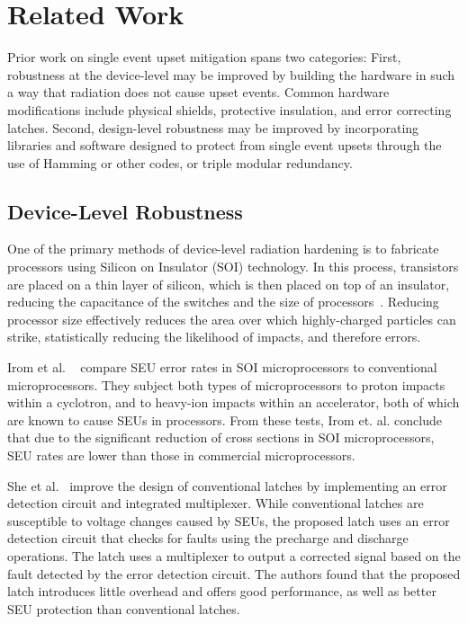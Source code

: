 \vspace{-25pt}
\section{Related Work}\label{sec:related_work}
\vspace{-10pt}
Prior work on single event upset mitigation spans two categories:
First, robustness at the device-level may be improved by building the hardware in such a way that radiation does not cause upset events. 
Common hardware modifications include physical shields, protective insulation, and error correcting latches.
Second, design-level robustness may be improved by incorporating libraries and software designed to protect from single event upsets through the use of Hamming or other codes, or triple modular redundancy.
\vspace{-15pt}
\subsection{Device-Level Robustness}
\vspace{-5pt}
One of the primary methods of device-level radiation hardening is to fabricate processors using Silicon on Insulator (SOI) technology.
In this process, transistors are placed on a thin layer of silicon, which is then placed on top of an insulator, reducing the capacitance of the switches and the size of processors~\cite{Celler2003SOI}.
Reducing processor size effectively reduces the area over which highly-charged particles can strike, statistically reducing the likelihood of impacts, and therefore errors.

Irom et al. ~\cite{Irom2002SOI} compare SEU error rates in  SOI microprocessors to conventional microprocessors.
They subject both types of microprocessors to proton impacts within a cyclotron, and to heavy-ion impacts within an accelerator, both of which are known to cause SEUs in processors.
From these tests, Irom et. al. conclude that due to the significant reduction of cross sections in SOI microprocessors, SEU rates are lower than those in commercial microprocessors.

She et al.~\cite{She2012Latch} improve the design of conventional latches by implementing an error detection circuit and integrated multiplexer.
While conventional latches are susceptible to voltage changes caused by SEUs, the proposed latch uses an error detection circuit that checks for faults using the precharge and discharge operations.
The latch uses a multiplexer to output a corrected signal based on the fault detected by the error detection circuit.
The authors found that the proposed latch introduces little overhead and offers good performance, as well as better SEU protection than conventional latches.
\vspace{-15pt}
